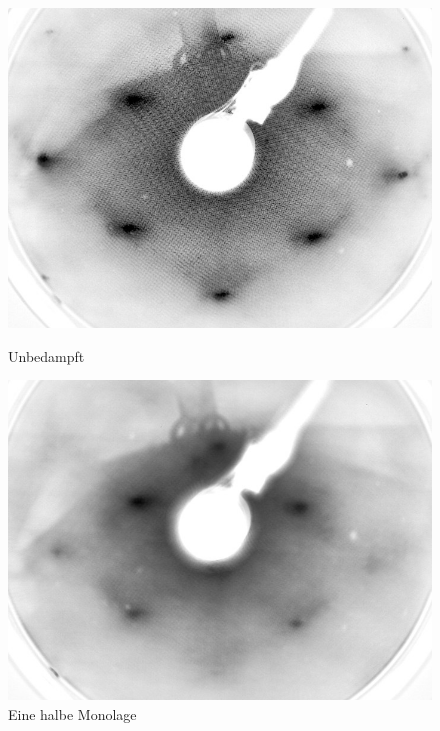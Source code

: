 
\begin{figure}[htbp]
	\begin{minipage}[b]{0.5\textwidth} 
		\includegraphics[width=\textwidth]{LEED-Bilder/bearbeitet/unbedampft_E207}
		\caption{Unbedampft}
		\label{Bild} 
	\end{minipage}
	\hfill
	\begin{minipage}[b]{0.5\textwidth}
		\includegraphics[width=\textwidth]{LEED-Bilder/bearbeitet/0_5ML_E208}
		\caption{Eine halbe Monolage}
		\label{Bild} 
	\end{minipage}
	

\end{figure}
